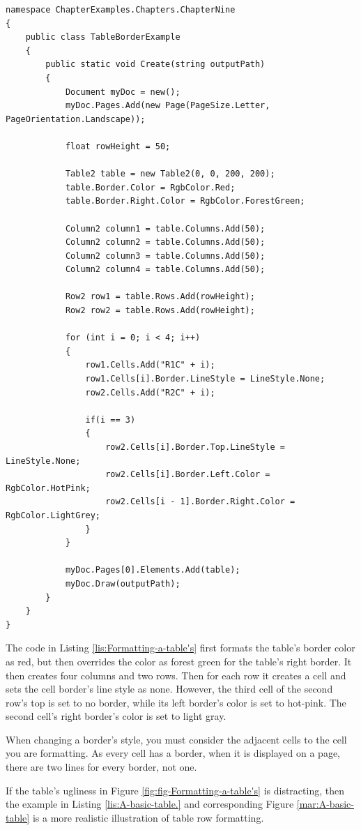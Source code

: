 \documentclass[american]{tufte-book}
\numberwithin{equation}{section}
\numberwithin{figure}{section}
\begin{document}
{\begin{lstlisting}[caption={Formatting a table's borders.},label={lis:Formatting-a-table's},basicstyle={\footnotesize\ttfamily},breaklines=true]
namespace ChapterExamples.Chapters.ChapterNine
{
    public class TableBorderExample
    {
        public static void Create(string outputPath)
        {
            Document myDoc = new();
            myDoc.Pages.Add(new Page(PageSize.Letter, PageOrientation.Landscape));

            float rowHeight = 50;

            Table2 table = new Table2(0, 0, 200, 200);
            table.Border.Color = RgbColor.Red;
            table.Border.Right.Color = RgbColor.ForestGreen;

            Column2 column1 = table.Columns.Add(50);
            Column2 column2 = table.Columns.Add(50);
            Column2 column3 = table.Columns.Add(50);
            Column2 column4 = table.Columns.Add(50);

            Row2 row1 = table.Rows.Add(rowHeight);
            Row2 row2 = table.Rows.Add(rowHeight);

            for (int i = 0; i < 4; i++)
            {
                row1.Cells.Add("R1C" + i);
                row1.Cells[i].Border.LineStyle = LineStyle.None;
                row2.Cells.Add("R2C" + i);

                if(i == 3)
                {
                    row2.Cells[i].Border.Top.LineStyle = LineStyle.None;
                    row2.Cells[i].Border.Left.Color = RgbColor.HotPink;
                    row2.Cells[i - 1].Border.Right.Color = RgbColor.LightGrey;
                }
            }

            myDoc.Pages[0].Elements.Add(table);
            myDoc.Draw(outputPath);
        }
    }
}
\end{lstlisting}
\leavevmode\egroup

The code in Listing \ref{lis:Formatting-a-table's} first formats
the table's border color as red, but then overrides the color as forest
green for the table's right border. It then creates four columns and
two rows. Then for each row it creates a cell and sets the cell border's
line style as none. However, the third cell of the second row's top
is set to no border, while its left border's color is set to hot-pink.
The second cell's right border's color is set to light gray. 

When changing a border's style, you must consider the adjacent cells
to the cell you are formatting. As every cell has a border, when it
is displayed on a page, there are two lines for every border, not
one. 

If the table's ugliness in Figure \ref{fig:fig-Formatting-a-table's}
is distracting, then the example in Listing \ref{lis:A-basic-table.}
and corresponding Figure \ref{mar:A-basic-table} is a more realistic
illustration of table row formatting.

}
\end{document}
